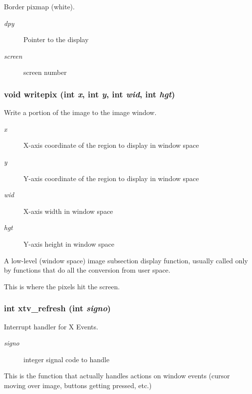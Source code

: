 Border pixmap (white). 

\begin{Desc}
\item[Parameters:]
\begin{description}
\item[{\em dpy}]Pointer to the display \item[{\em screen}]screen number \end{description}
\end{Desc}
\subsubsection{\setlength{\rightskip}{0pt plus 5cm}void writepix (int {\em x}, int {\em y}, int {\em wid}, int {\em hgt})}\label{xtvutils_8c_a207}


Write a portion of the image to the image window. 

\begin{Desc}
\item[Parameters:]
\begin{description}
\item[{\em x}]X-axis coordinate of the region to display in window space \item[{\em y}]Y-axis coordinate of the region to display in window space \item[{\em wid}]X-axis width in window space \item[{\em hgt}]Y-axis height in window space\end{description}
\end{Desc}
A low-level (window space) image subsection display function, usually called only by functions that do all the conversion from user space.

This is where the pixels hit the screen. 
\subsubsection{\setlength{\rightskip}{0pt plus 5cm}int xtv\_\-refresh (int {\em signo})}\label{xtvutils_8c_a208}


Interrupt handler for X Events. 

\begin{Desc}
\item[Parameters:]
\begin{description}
\item[{\em signo}]integer signal code to handle\end{description}
\end{Desc}
This is the function that actually handles actions on window events (cursor moving over image, buttons getting pressed, etc.) 
